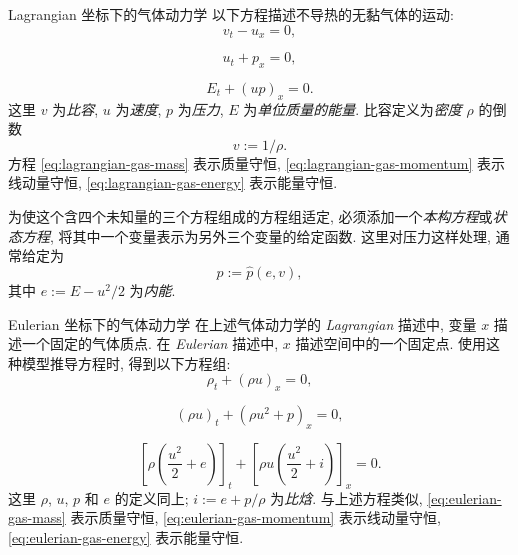 \begin{Example}{Lagrangian 坐标下的气体动力学}
\label{ex:lagrangian-gas-dynamics}
以下方程描述不导热的无黏气体的运动:
\begin{equation}\label{eq:lagrangian-gas-mass}
v_t-u_x=0,
\end{equation}

\begin{equation}\label{eq:lagrangian-gas-momentum}
u_t+p_x=0,
\end{equation}

\begin{equation}\label{eq:lagrangian-gas-energy}
E_t+(up)_x=0.
\end{equation}
这里 $v$ 为\emph{比容}, $u$ 为\emph{速度}, $p$ 为\emph{压力}, $E$ 为\emph{单位质量的能量}. 比容定义为\emph{密度} $\rho$ 的倒数
\begin{equation}\label{eq:specific-volume-density}
v:=1/\rho.
\end{equation}
方程 \eqref{eq:lagrangian-gas-mass} 表示质量守恒, \eqref{eq:lagrangian-gas-momentum} 表示线动量守恒, \eqref{eq:lagrangian-gas-energy} 表示能量守恒.

为使这个含四个未知量的三个方程组成的方程组适定, 必须添加一个\emph{本构方程}或\emph{状态方程}, 将其中一个变量表示为另外三个变量的给定函数. 这里对压力这样处理, 通常给定为
\begin{equation}\label{eq:gas-pressure-state-equation}
p:=\hat p(e,v),
\end{equation}
其中 $e:=E-u^2/2$ 为\emph{内能}.
\end{Example}

\begin{Example}{Eulerian 坐标下的气体动力学}
\label{ex:eulerian-gas-dynamics}
在上述气体动力学的 \emph{Lagrangian} 描述中, 变量 $x$ 描述一个固定的气体质点. 在 \emph{Eulerian} 描述中, $x$ 描述空间中的一个固定点. 使用这种模型推导方程时, 得到以下方程组:
\begin{equation}\label{eq:eulerian-gas-mass}
\rho_t+(\rho u)_x=0,
\end{equation}

\begin{equation}\label{eq:eulerian-gas-momentum}
(\rho u)_t+(\rho u^2+p)_x=0,
\end{equation}

\begin{equation}\label{eq:eulerian-gas-energy}
\left[\rho\left(\dfrac{u^2}{2}+e\right)\right]_t+\left[\rho u\left(\dfrac{u^2}{2}+i\right)\right]_x=0.
\end{equation}
这里 $\rho$, $u$, $p$ 和 $e$ 的定义同上; $i:=e+p/\rho$ 为\emph{比焓}. 与上述方程类似, \eqref{eq:eulerian-gas-mass} 表示质量守恒, \eqref{eq:eulerian-gas-momentum} 表示线动量守恒, \eqref{eq:eulerian-gas-energy} 表示能量守恒.
\end{Example}
